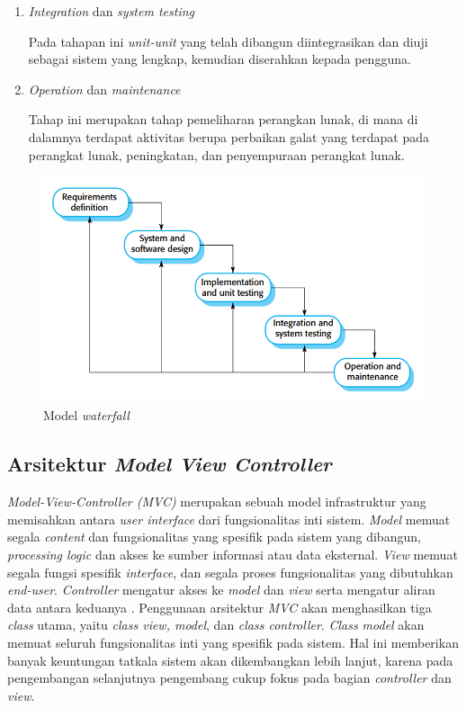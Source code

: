 \begin{enumerate}[
  leftmargin=0pt, itemindent=20pt,
  labelwidth=15pt, labelsep=5pt, listparindent=0.7cm,
  align=left]
\item \emph{Integration} dan \emph{system testing}

  Pada tahapan ini \emph{unit-unit} yang telah dibangun diintegrasikan
  dan diuji sebagai sistem yang lengkap, kemudian
  diserahkan kepada pengguna.

\item \emph{Operation} dan \emph{maintenance}

  Tahap ini merupakan tahap pemeliharan perangkan lunak, di mana
  di dalamnya terdapat aktivitas berupa perbaikan galat yang terdapat
  pada perangkat lunak, peningkatan, dan penyempuraan perangkat lunak.

\end{enumerate}

\begin{figure}[tph]
  \centering
  \includegraphics[width=.7\linewidth]{img/waterfall}
  \caption{Model \emph{waterfall} \parencite{sommerville2016software}}\label{fig:waterfall}
\end{figure}

\subsection{Arsitektur \emph{Model View Controller}}

\emph{Model-View-Controller (MVC)} merupakan sebuah model
infrastruktur yang memisahkan antara \emph{user interface} dari
fungsionalitas inti sistem. \emph{Model} memuat segala
\emph{content} dan fungsionalitas yang spesifik pada sistem yang
dibangun, \emph{processing logic} dan akses ke sumber informasi atau
data eksternal. \emph{View} memuat segala fungsi spesifik
\emph{interface}, dan segala proses fungsionalitas yang dibutuhkan
\emph{end-user}. \emph{Controller} mengatur akses ke
\emph{model} dan \emph{view} serta mengatur aliran data antara
keduanya \parencite{pressman2010software}. Penggunaan arsitektur \emph{MVC} akan
menghasilkan tiga \emph{class} utama, yaitu \emph{class view, model},
dan \emph{class controller}. \emph{Class model} akan memuat seluruh
fungsionalitas inti yang spesifik pada sistem. Hal ini memberikan
banyak keuntungan tatkala sistem akan dikembangkan lebih lanjut,
karena pada pengembangan selanjutnya pengembang cukup fokus pada bagian
\emph{controller} dan \emph{view}.

